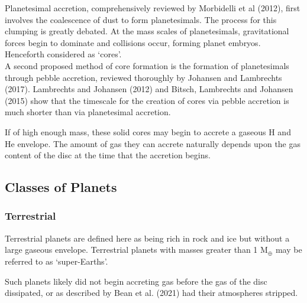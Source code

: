 \documentclass[a4paper,twocolumn,12pt]{article}
\begin{document}
Planetesimal accretion, comprehensively reviewed by Morbidelli et al (2012)\cite{EarthFormation}, first involves the coalescence of dust to form planetesimals. The process for this clumping is greatly debated. At the mass scales of planetesimals, gravitational forces begin to dominate and collisions occur, forming planet embryos. Henceforth considered as `cores'.\\
A second proposed method of core formation is the formation of planetesimals
through pebble accretion, reviewed thoroughly by Johansen and Lambrechts (2017)\cite{JohansenPebbleAccretionReview}. Lambrechts and Johansen (2012)\cite{L-J-2012} and Bitsch, Lambrechts and Johansen (2015)\cite{BitschPebbleAccretion2015} show that the timescale for the creation of cores via pebble accretion is much shorter than via planetesimal accretion.



If of high enough mass, these solid cores may begin to accrete a gaseous H and He envelope. The amount of gas they can accrete naturally depends upon the gas content of the disc at the time that the accretion begins.


\subsection{Classes of Planets}
\label{section: Planet formation}
\subsubsection{Terrestrial}
Terrestrial planets are defined here as being rich in rock and ice but without a large gaseous envelope. Terrestrial planets with masses greater than 1 M$ _\oplus$ may be referred to as `super-Earths'.

Such planets likely did not begin accreting gas before the gas of the disc dissipated, or as described by Bean et al. (2021)\cite{NatureAndOriginOfSubNeptunesGoodPaper} had their atmospheres stripped.
\end{document}
